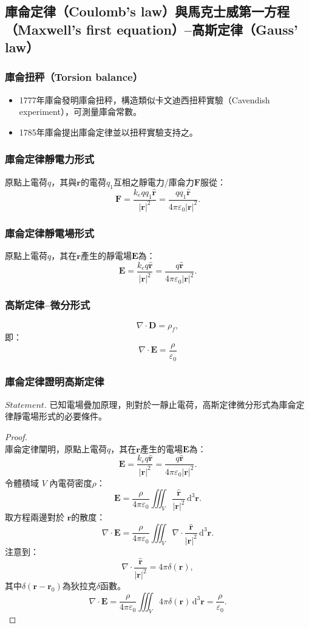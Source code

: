 \documentclass[a4paper,12pt]{report}
\begin{document}
\begin{itemize}
\subsection{庫侖定律（Coulomb's law）與馬克士威第一方程（Maxwell's first equation）–高斯定律（Gauss' law）}
\subsubsection{庫侖扭秤（Torsion balance）}
\begin{itemize}
\item 1777年庫侖發明庫侖扭秤，構造類似卡文迪西扭秤實驗（Cavendish experiment），可測量庫侖常數。
\item 1785年庫侖提出庫侖定律並以扭秤實驗支持之。
\end{itemize}
\subsubsection{庫侖定律靜電力形式}
原點上電荷$q$，其與$\mathbf{r}$的電荷$q_1$互相之靜電力/庫侖力$\mathbf{F}$服從：
\[ \mathbf{F} = \frac{k_eqq_1\hat{\mathbf{r}}}{|\mathbf{r}|^2}=\frac{qq_1\hat{\mathbf{r}}}{4\pi\varepsilon_0|\mathbf{r}|^2}.\]
\subsubsection{庫侖定律靜電場形式}
原點上電荷$q$，其在$\mathbf{r}$產生的靜電場$\mathbf{E}$為：
\[\mathbf{E}=\frac{k_eq\hat{\mathbf{r}}}{|\mathbf{r}|^2}=\frac{q\hat{\mathbf{r}}}{4\pi\varepsilon_0|\mathbf{r}|^2}.\]
\subsubsection{高斯定律–微分形式}
\[\nabla\cdot\mathbf{D}=\rho_f,\]
即：
\[\nabla\cdot\mathbf{E}=\frac{\rho}{\varepsilon_0}\]
\subsubsection{庫侖定律證明高斯定律}
\(\textit{Statement.}\) 已知電場疊加原理，則對於一靜止電荷，高斯定律微分形式為庫侖定律靜電場形式的必要條件。
\begin{proof}\mbox{}\\
庫侖定律闡明，原點上電荷$q$，其在$\mathbf{r}$產生的電場$\mathbf{E}$為：
\[\mathbf{E}=\frac{k_eq\hat{\mathbf{r}}}{|\mathbf{r}|^2}=\frac{q\hat{\mathbf{r}}}{4\pi\varepsilon_0|\mathbf{r}|^2}.\]
令體積域 $V$ 內電荷密度$\rho$：
\[\mathbf{E}=\frac{\rho}{4\pi\varepsilon_0}\iiint_V\frac{\hat{\mathbf{r}}}{|\mathbf{r}|^2}\,\mathrm{d}^{3}\mathbf{r}.\]
取方程兩邊對於 $ \mathbf {r} $的散度：
\[\nabla\cdot\mathbf{E}=\frac{\rho}{4\pi\varepsilon_0}\iiint_V\nabla\cdot\frac{\hat{\mathbf{r}}}{|\mathbf{r}|^2}\,\mathrm{d}^{3}\mathbf{r}.\]
注意到：
\[\nabla\cdot\frac{\hat{\mathbf{r}}}{|\mathbf{r}|^2}=4\pi\delta(\mathbf{r}),\]
其中$\delta(\mathbf{r}-\mathbf{r}_0)$為狄拉克$\delta$函數。
\[\nabla\cdot\mathbf{E}=\frac{\rho}{4\pi\varepsilon_0}\iiint_V4\pi\delta(\mathbf{r})\,\mathrm{d}^{3}\mathbf{r}=\frac{\rho}{\varepsilon_0}.\]
\end{proof}

\end{itemize}
\end{document}
